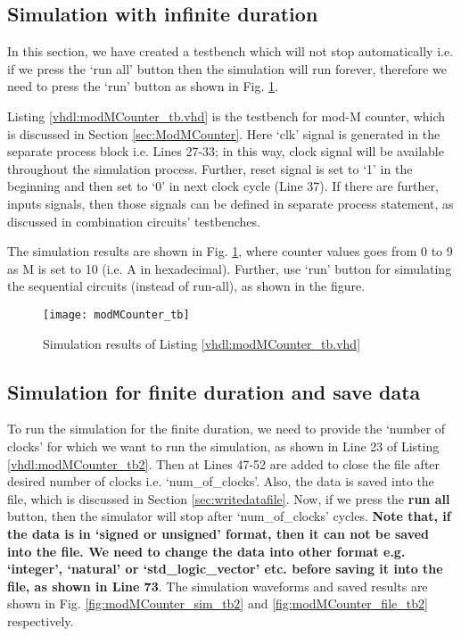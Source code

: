 \subsection{Simulation with infinite duration}
In this section, we have created a testbench which will not stop automatically i.e. if we press the `run all' button then the simulation will run forever, therefore we need to press the `run' button as shown in Fig. \ref{fig:modMCounter_tb}.
\begin{explanation}
	Listing \ref{vhdl:modMCounter_tb.vhd} is the testbench for mod-M counter, which is discussed in Section \ref{sec:ModMCounter}. Here `clk' signal is generated in the separate process block i.e. Lines 27-33; in this way, clock signal will be available throughout the simulation process. Further, reset signal is set to `1' in the beginning and then set to `0' in next clock cycle (Line 37). If there are further, inputs signals, then those signals can be defined in separate process statement, as discussed in combination circuits' testbenches. 
	
	The simulation results are shown in Fig. \ref{fig:modMCounter_tb}, where counter values goes from 0 to 9 as M is set to 10 (i.e. A in hexadecimal). Further, use `run' button for simulating the sequential circuits (instead of run-all), as shown in the figure. 
\end{explanation}




\begin{figure}[!h]
	\centering
	\texttt{[image: modMCounter\_tb]}
	\caption{Simulation results of Listing \ref{vhdl:modMCounter_tb.vhd}}
	\label{fig:modMCounter_tb}
\end{figure}

\subsection{Simulation for finite duration and save data}
To run the simulation for the finite duration, we need to provide the `number of clocks' for which we want to run the simulation, as shown in Line 23 of Listing \ref{vhdl:modMCounter_tb2}. Then at Lines 47-52 are added to close the file after desired number of clocks i.e. `num\_of\_clocks'. Also, the data is saved into the file, which is discussed in Section \ref{sec:writedatafile}. Now, if we press the \textbf{run all} button, then the simulator will stop after `num\_of\_clocks' cycles. \textbf{Note that, if the data is in `signed or unsigned' format, then it can not be saved into the file. We need to change the data into other format e.g. `integer', `natural' or `std\_logic\_vector' etc. before saving it into the file, as shown in Line 73}. The simulation waveforms and saved results are shown in Fig. \ref{fig:modMCounter_sim_tb2} and \ref{fig:modMCounter_file_tb2} respectively.

